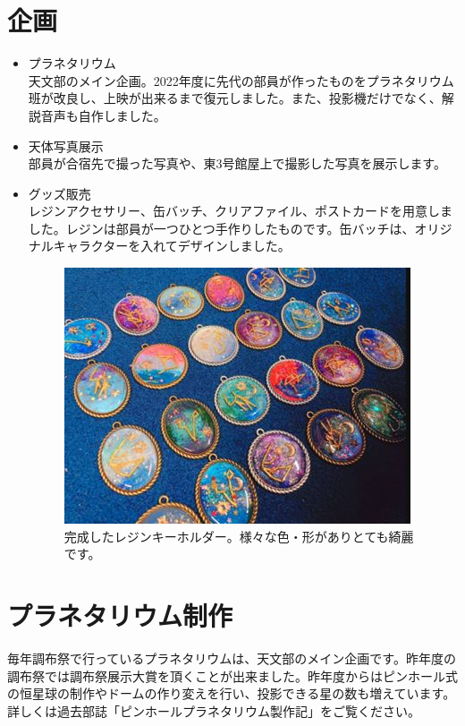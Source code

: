 \documentclass[../super_nova_20yy]{subfiles}
\begin{document}
\section{企画}

\begin{itemize}
  \item プラネタリウム\hbox{}\\
  天文部のメイン企画。2022年度に先代の部員が作ったものをプラネタリウム班が改良し、上映が出来るまで復元しました。また、投影機だけでなく、解説音声も自作しました。
  \item 天体写真展示\hbox{}\\
  部員が合宿先で撮った写真や、東3号館屋上で撮影した写真を展示します。
  \item グッズ販売\hbox{}\\
  レジンアクセサリー、缶バッチ、クリアファイル、ポストカードを用意しました。レジンは部員が一つひとつ手作りしたものです。缶バッチは、オリジナルキャラクターを入れてデザインしました。\hbox{}\\
  \begin{figure}
    \centering
    \includegraphics[width=.5\columnwidth]{画像8.jpg}
    \caption{完成したレジンキーホルダー。様々な色・形がありとても綺麗です。}
    \label{fig:8}
  \end{figure}
\end{itemize}

\section{プラネタリウム制作}

毎年調布祭で行っているプラネタリウムは、天文部のメイン企画です。昨年度の調布祭では調布祭展示大賞を頂くことが出来ました。昨年度からはピンホール式の恒星球の制作やドームの作り変えを行い、投影できる星の数も増えています。詳しくは過去部誌「ピンホールプラネタリウム製作記」をご覧ください。
\end{document}
